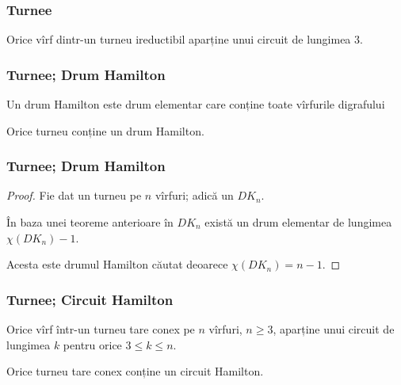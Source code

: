\begin{frame}
  \frametitle{Turnee}

\begin{corollary}
Orice vîrf dintr-un turneu ireductibil aparține unui circuit de lungimea 3. 
\end{corollary}

\end{frame}

\begin{frame}
  \frametitle{Turnee; Drum Hamilton}

Un drum Hamilton este drum elementar care conține toate vîrfurile digrafului

\begin{theorem}
Orice turneu conține un drum Hamilton. 
\end{theorem}

\end{frame}


\begin{frame}
  \frametitle{Turnee; Drum Hamilton}

\begin{proof}
Fie dat un turneu pe $n$ vîrfuri; adică un $DK_n$.

În baza unei teoreme anterioare în $DK_n$ există un drum elementar de lungimea $\chi(DK_n)-1$.

Acesta este drumul Hamilton căutat deoarece $\chi(DK_n)=n-1$.
\end{proof}


\end{frame}

\begin{frame}
  \frametitle{Turnee; Circuit Hamilton}

\begin{theorem}
Orice vîrf într-un turneu tare conex pe $n$ vîrfuri, $n\geq 3$, aparține unui circuit de lungimea $k$ pentru orice $3\leq k\leq n$.
\end{theorem}

\begin{corollary}
Orice turneu tare conex conține un circuit Hamilton.
\end{corollary}

\end{frame}



